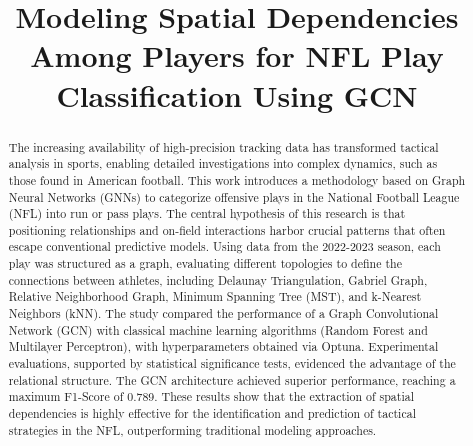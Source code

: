 \documentclass[runningheads]{llncs}
\begin{document}
%
\title{Modeling Spatial Dependencies Among Players for NFL Play Classification Using GCN}







\maketitle              %
%


\begin{abstract}
The increasing availability of high-precision tracking data has transformed tactical analysis in sports, enabling detailed investigations into complex dynamics, such as those found in American football. This work introduces a methodology based on Graph Neural Networks (GNNs) to categorize offensive plays in the National Football League (NFL) into run or pass plays. The central hypothesis of this research is that positioning relationships and on-field interactions harbor crucial patterns that often escape conventional predictive models. Using data from the 2022-2023 season, each play was structured as a graph, evaluating different topologies to define the connections between athletes, including Delaunay Triangulation, Gabriel Graph, Relative Neighborhood Graph, Minimum Spanning Tree (MST), and k-Nearest Neighbors (kNN). The study compared the performance of a Graph Convolutional Network (GCN) with classical machine learning algorithms (Random Forest and Multilayer Perceptron), with hyperparameters obtained via Optuna. Experimental evaluations, supported by statistical significance tests, evidenced the advantage of the relational structure. The GCN architecture achieved superior performance, reaching a maximum F1-Score of 0.789. These results show that the extraction of spatial dependencies is highly effective for the identification and prediction of tactical strategies in the NFL, outperforming traditional modeling approaches.

\end{abstract}
%
%
%
\end{document}

